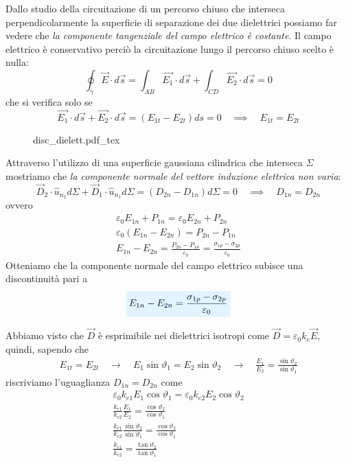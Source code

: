 \documentclass[x11names]{report}
\newcommand{\incfig}[1]{%
	{#1.pdf_tex}
}
\newcommand{\viola}[1]{%
	\colorbox{myblue}{$\displaystyle #1$}
}
\begin{document}
Dallo studio della circuitazione di un percorso chiuso che interseca perpendicolarmente la superficie di separazione dei due dielettrici possiamo far vedere che \textit{la componente tangenziale del campo elettrico è costante}. Il campo elettrico è conservativo perciò la circuitazione lungo il percorso chiuso scelto è nulla:
\[
\oint_\gamma \vec{E}\cdot d\vec{s} = \int_{AB} \vec{E_1}\cdot d\vec{s} + \int_{CD}  \vec{E_2}\cdot  d\vec{s} = 0
\]
che si verifica solo se
\[
\vec{E_1}\cdot  d\vec{s} + \vec{E_2}\cdot  d\vec{s} =( E_{1t}  - E_{2t})ds = 0 \quad \implies \quad  E_{1t} = E_{2t}
\]

\begin{figure}[H]
	\centering
	\incfig{disc_dielett}
\end{figure}

Attraverso l'utilizzo di una superficie gaussiana cilindrica che interseca \(\Sigma\) mostriamo che \textit{la componente normale del vettore induzione elettrica non varia}:
\[
\vec{D}_2 \cdot \hat{u}_{n_2} d\Sigma + \vec{D}_1 \cdot \hat{u}_{n_1} d\Sigma = (D_{2n} - D_{1n})d\Sigma = 0 \quad \implies \quad D_{1n} = D_{2n}
\]
ovvero
\begin{gather*}
	\varepsilon_0 E_{1n} + P_{1n} = \varepsilon_0 E_{2n} + P_{2n} \\
	\varepsilon_0\left(E_{1n} - E_{2n}\right) = P_{2n} - P_{1n} \\
	E_{1n} - E_{2n} = \frac{P_{2n} - P_{1n}}{\varepsilon_0} = \frac{\sigma_{1p} - \sigma_{2p}}{\varepsilon_0}
\end{gather*}
Otteniamo che la componente normale del campo elettrico subisce una discontinuità pari a 
\begin{equation}
	\viola{E_{1n} - E_{2n} = \frac{\sigma_{1p} - \sigma_{2p}}{\varepsilon_0}}
\end{equation}

Abbiamo visto che \(\vec{D}\) è esprimibile nei dielettrici isotropi come \(\vec{D} = \varepsilon_0 k_e\vec{E}\), quindi, sapendo che
\begin{gather*}
	E_{1t} = E_{2t} \quad \to \quad E_1\sin\vartheta_1 = E_2\sin\vartheta_2 \quad \to \quad \frac{E_1}{E_2} = \frac{\sin\vartheta_2}{\sin\vartheta_1} 
\end{gather*}
riscriviamo l'uguaglianza \(D_{1n} = D_{2n}\) come 
\begin{gather*}
	\varepsilon_0 k_{e1} E_1\cos\vartheta_1 = \varepsilon_0 k_{e2} E_2\cos\vartheta_2 \\
	\frac{k_{e1}}{k_{e2}}\frac{E_1}{E_2} = \frac{\cos\vartheta_2}{\cos\vartheta_1} \\
	\frac{k_{e1}}{k_{e2}}\frac{\sin\vartheta_2}{\sin\vartheta_1} = \frac{\cos\vartheta_2}{\cos\vartheta_1} \\
	\frac{k_{e1}}{k_{e2}} =\frac{\tan\vartheta_2}{\tan\vartheta_1}
\end{gather*}
\end{document}
